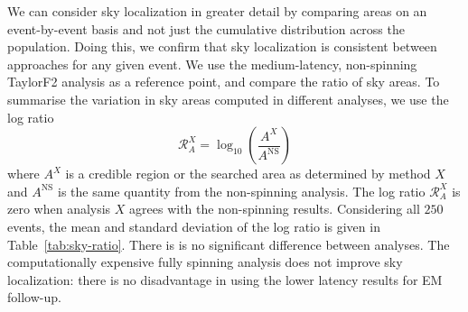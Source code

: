 We can consider sky localization in greater detail by comparing areas on an event-by-event basis and not just the cumulative distribution across the population. Doing this, we confirm that sky localization is consistent between approaches for any given event. We use the medium-latency, non-spinning TaylorF2 analysis as a reference point, and compare the ratio of sky areas. To summarise the variation in sky areas computed in different analyses, we use the log ratio
\begin{equation}
\mathcal{R}_A^X = \log_{10}\left(\frac{A^X}{A^\mathrm{NS}}\right)
\end{equation}
where $A^X$ is a credible region or the searched area as determined by method $X$ and $A^\mathrm{NS}$ is the same quantity from the non-spinning analysis. The log ratio $\mathcal{R}_A^X$ is zero when analysis $X$ agrees with the non-spinning results. Considering all $250$ events, the mean and standard deviation of the log ratio is given in Table~\ref{tab:sky-ratio}. There is is no significant difference between analyses. The computationally expensive fully spinning analysis does not improve sky localization: there is no disadvantage in using the lower latency results for EM follow-up.
